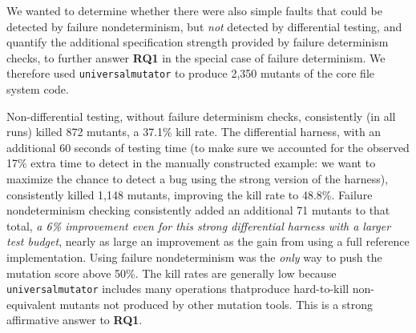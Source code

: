 {%

We wanted to determine whether there were also simple faults that
could be detected by failure nondeterminism, but \emph{not} detected
by differential testing, and quantify the additional specification
strength provided by failure determinism checks, to further answer
{\bf RQ1} in the special case of failure determinism.  We therefore used
{\tt universalmutator} \cite{RegExpMut} to produce 2,350 mutants of
the core file system code.   %

Non-differential testing, without failure determinism checks,
consistently (in all runs) killed
872 mutants, a 37.1\% kill rate.
The differential harness, with an additional 60 seconds of testing
time (to make sure we accounted for the observed 17\%
extra time to detect in the manually constructed example: we want to
maximize the chance to detect a bug using the strong version of the harness), consistently killed 1,148 mutants, improving the kill rate to 48.8\%.  Failure
nondeterminism checking consistently added an
additional 71 mutants to that total, \emph{a 6\% improvement even for
this strong differential harness with a larger test budget}, nearly as
large an improvement as the gain from using a full reference
implementation.  Using
failure nondeterminism was the \emph{only} way to push the mutation score
above 50\%.  The kill rates are generally low
because {\tt universalmutator} includes many operations
thatproduce hard-to-kill
non-equivalent mutants not produced by other mutation tools.  This is a strong affirmative answer to {\bf
  RQ1}.

}
